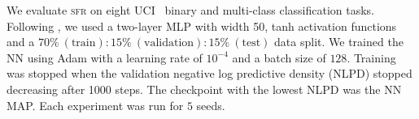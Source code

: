 \documentclass{article}
\newcommand{\our}{\textsc{sfr}\xspace}
\begin{document}
%

%
We evaluate \our on eight UCI~\citep{UCI} binary and multi-class classification tasks.
Following \citet{immer2021improving}, we used a two-layer MLP with width 50, tanh activation functions and a
$70\%\ (\text{train}):15\%\ (\text{validation}) :15\%\ (\text{test})$ data split.
We trained the NN using Adam \cite{adam} with a learning rate of $10^{-4}$ and a batch size of $128$.
Training was stopped when the validation negative log predictive density (NLPD) stopped decreasing after 1000 steps.
The checkpoint with the lowest NLPD was the NN MAP.
Each experiment was run for $5$ seeds.
\end{document}
